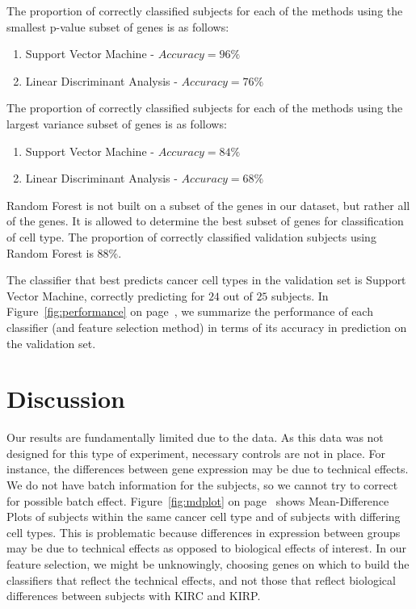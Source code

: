 The proportion of correctly classified subjects for each of the methods using
the smallest p-value subset of genes is as follows:

\begin{enumerate}
\item Support Vector Machine - $Accuracy = 96\%$
\item Linear Discriminant Analysis - $Accuracy = 76\%$
\end{enumerate}

The proportion of correctly classified subjects for each of the methods using
the largest variance subset of genes is as follows:

\begin{enumerate}
\item Support Vector Machine - $Accuracy = 84\% $
\item Linear Discriminant Analysis - $Accuracy =68\% $
\end{enumerate}

Random Forest is not built on a subset of the genes in our dataset, but rather
all of the genes. It is allowed to determine the best subset of genes for
classification of cell type. The proportion of correctly classified validation
subjects using Random Forest is $88\%$.

The classifier that best predicts cancer cell types in the validation set is
Support Vector Machine, correctly predicting for $24$ out of $25$ subjects.
In Figure~\ref{fig:performance} on page~\pageref{fig:performance}, we
summarize the performance of each classifier (and feature selection
method) in terms of its accuracy in prediction on the validation set.


\section{Discussion}

Our results are fundamentally limited due to the data. As this data was not
designed for this type of experiment, necessary controls are not in place. For
instance, the differences between gene expression may be due to technical
effects. We do not have batch information for the subjects, so we cannot try to
correct for possible batch effect. Figure~\ref{fig:mdplot} on
page~\pageref{fig:mdplot} shows Mean-Difference Plots of subjects within the
same cancer cell type and of subjects with differing cell types.  This is
problematic because differences in expression between groups may be due to
technical effects as opposed to biological effects of interest.  In our feature
selection, we might be unknowingly, choosing genes on which to build the
classifiers that reflect the technical effects, and not those that reflect
biological differences between subjects with KIRC and KIRP.

